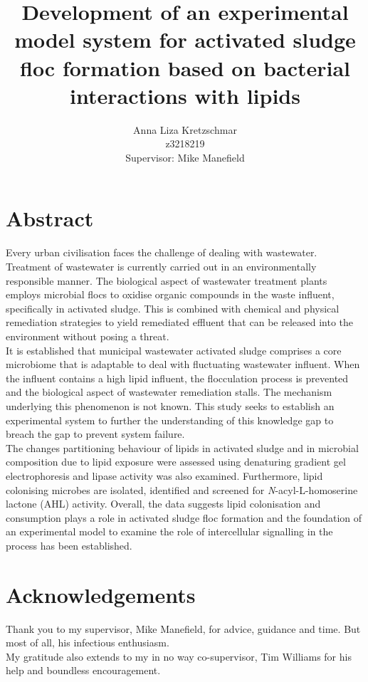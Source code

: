 \documentclass[twoside]{article}
\title{\textbf{Development of an experimental model system for activated sludge floc formation based on bacterial interactions with lipids}}
\author{Anna Liza Kretzschmar\\
        z3218219\\
        Supervisor: Mike Manefield}
\date{}
\begin{document}
\thispagestyle{plain}
\pagestyle{plain}
\setcounter{page}{1}


\section{Abstract}
Every urban civilisation faces the challenge of dealing with wastewater.  Treatment of wastewater is currently carried out in an environmentally responsible manner. The biological aspect of wastewater treatment plants employs microbial flocs to oxidise organic compounds in the waste influent, specifically in activated sludge. This is combined with chemical and physical remediation strategies to yield remediated effluent that can be released into the environment without posing a  threat. \\

It is established that municipal wastewater activated sludge comprises a core microbiome that is adaptable to deal with fluctuating wastewater influent. When the influent contains a high lipid influent, the flocculation process is prevented and the biological aspect of wastewater remediation stalls. The mechanism underlying this phenomenon is not known. This study seeks to establish an experimental system to further the understanding of this knowledge gap to breach the gap to prevent system failure. \\

The changes partitioning behaviour of lipids in activated sludge and in microbial composition due to lipid exposure were assessed using denaturing gradient gel electrophoresis and lipase activity was also examined. Furthermore, lipid colonising microbes are isolated, identified and screened for \emph{N}-acyl-L-homoserine lactone (AHL) activity. Overall, the data suggests lipid colonisation and consumption plays a role in activated sludge floc formation and the foundation of an experimental model to examine the role of intercellular signalling in the process has been established.
 
\newpage
\section{Acknowledgements}
\thispagestyle{plain}
Thank you to my supervisor, Mike Manefield, for advice, guidance and time. But most of all, his infectious enthusiasm.\\

My gratitude also extends to my in no way co-supervisor, Tim Williams for his help and boundless encouragement.\\
\end{document}
